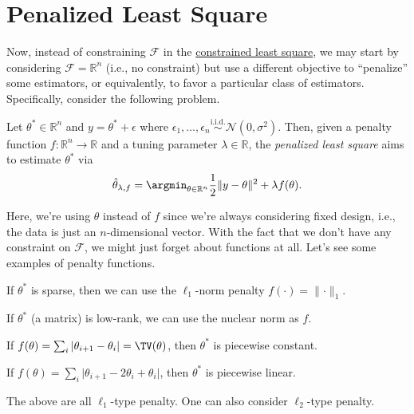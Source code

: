 \section{Penalized Least Square}
Now, instead of constraining \(\mathscr{F} \) in the \hyperref[prb:constrained-LS]{constrained least square}, we may start by considering \(\mathscr{F} = \mathbb{R} ^n\) (i.e., no constraint) but use a different objective to ``penalize'' some estimators, or equivalently, to favor a particular class of estimators. Specifically, consider the following problem.

\begin{problem}\label{prb:penalized-LS}
Let \(\theta ^{\ast} \in \mathbb{R} ^n\) and \(y = \theta ^{\ast} + \epsilon \) where \(\epsilon _1, \dots , \epsilon _n \overset{\text{i.i.d.} }{\sim } \mathcal{N} (0, \sigma ^2)\). Then, given a penalty function \(f\colon \mathbb{R} ^n \to \mathbb{R} \) and a tuning parameter \(\lambda \in \mathbb{R} \), the \emph{penalized least square} aims to estimate \(\theta ^{\ast} \) via
\[
	\hat{\theta}_{\lambda , f} = \argmin_{\theta \in \mathbb{R} ^n} \frac{1}{2} \lVert y - \theta \rVert ^2 + \lambda f(\theta ).
\]
\end{problem}

Here, we're using \(\theta \) instead of \(f\) since we're always considering fixed design, i.e., the data is just an \(n\)-dimensional vector. With the fact that we don't have any constraint on \(\mathscr{F} \), we might just forget about functions at all. Let's see some examples of penalty functions.

\begin{eg}
	If  \(\theta^{\ast} \) is sparse, then we can use the \(\ell _1\)-norm penalty \(f(\cdot) = \lVert \cdot \rVert _1\).
\end{eg}

\begin{eg}
	If \(\theta ^{\ast} \) (a matrix) is low-rank, we can use the nuclear norm as \(f\).
\end{eg}

\begin{eg}
	If \(f(\theta ) = \sum_{i} \vert \theta _{i+1} - \theta _i \vert = \TV(\theta )\), then \(\theta ^{\ast} \) is piecewise constant.
\end{eg}

\begin{eg}
	If \(f(\theta ) = \sum_{i} \vert \theta _{i+1} - 2 \theta _i + \theta _i\vert \), then \(\theta ^{\ast} \) is piecewise linear.
\end{eg}
The above are all \(\ell _1\)-type penalty. One can also consider \(\ell _2\)-type penalty.

